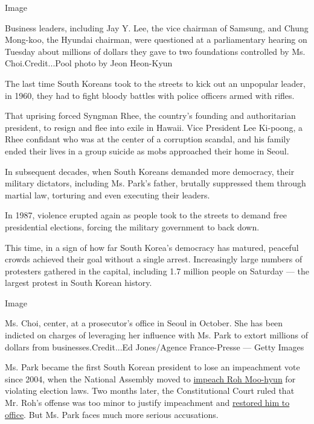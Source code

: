 Image

Business leaders, including Jay Y. Lee, the vice chairman of Samsung,
and Chung Mong-koo, the Hyundai chairman, were questioned at a
parliamentary hearing on Tuesday about millions of dollars they gave to
two foundations controlled by Ms. Choi.Credit...Pool photo by Jeon
Heon-Kyun

The last time South Koreans took to the streets to kick out an unpopular
leader, in 1960, they had to fight bloody battles with police officers
armed with rifles.

That uprising forced Syngman Rhee, the country's founding and
authoritarian president, to resign and flee into exile in Hawaii. Vice
President Lee Ki-poong, a Rhee confidant who was at the center of a
corruption scandal, and his family ended their lives in a group suicide
as mobs approached their home in Seoul.

In subsequent decades, when South Koreans demanded more democracy, their
military dictators, including Ms. Park's father, brutally suppressed
them through martial law, torturing and even executing their leaders.

In 1987, violence erupted again as people took to the streets to demand
free presidential elections, forcing the military government to back
down.

This time, in a sign of how far South Korea's democracy has matured,
peaceful crowds achieved their goal without a single arrest.
Increasingly large numbers of protesters gathered in the capital,
including 1.7 million people on Saturday --- the largest protest in
South Korean history.

Image

Ms. Choi, center, at a prosecutor's office in Seoul in October. She has
been indicted on charges of leveraging her influence with Ms. Park to
extort millions of dollars from businesses.Credit...Ed Jones/Agence
France-Presse --- Getty Images

Ms. Park became the first South Korean president to lose an impeachment
vote since 2004, when the National Assembly moved to
\href{http://www.nytimes.com/2004/03/13/world/president-s-impeachment-stirs-angry-protests-in-south-korea.html}{impeach
Roh Moo-hyun} for violating election laws. Two months later, the
Constitutional Court ruled that Mr. Roh's offense was too minor to
justify impeachment and
\href{http://www.nytimes.com/2004/05/14/world/constitutional-court-reinstates-south-korea-s-impeached-president.html}{restored
him to office}. But Ms. Park faces much more serious accusations.

